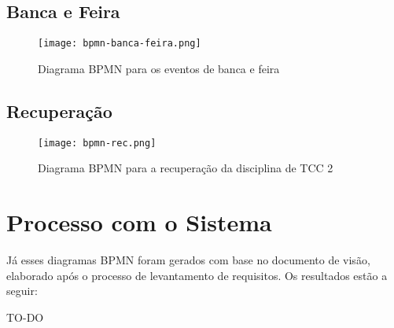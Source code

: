 \subsection{Banca e Feira}

\begin{figure}[H]
    \centering
    \texttt{[image: bpmn-banca-feira.png]}
    \caption{Diagrama BPMN para os eventos de banca e feira}
    \label{fig:bpmn-banca-feira}
\end{figure}

\subsection{Recuperação}

\begin{figure}[H]
    \centering
    \texttt{[image: bpmn-rec.png]}
    \caption{Diagrama BPMN para a recuperação da disciplina de TCC 2}
    \label{fig:bpmn-rec}
\end{figure}

\section{Processo com o Sistema}

Já esses diagramas BPMN foram gerados com base no documento de visão, elaborado após o processo de levantamento de requisitos. Os resultados estão a seguir:

TO-DO

